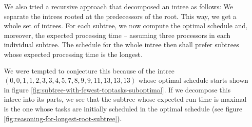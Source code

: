 We also tried a recursive approach that decomposed an intree as follows: We separate the intrees rooted at the predecessors of the root. This way, we get a whole set of intrees. For each subtree, we now compute the optimal schedule and, moreover, the expected processing time -- assuming three processors in each individual subtree. The schedule for the whole intree then shall prefer subtrees whose expected processing time is the longest.

We were tempted to conjecture this because of the intree $(0,0,1,1,2,3,3,4,5,7,8,9,9,11,13,13,13)$ whose optimal schedule starts shown in figure \ref{fig:subtree-with-fewest-toptasks-suboptimal}. If we decompose this intree into its parts, we see that the subtree whose expected run time is maximal is the one whose tasks are initially scheduled in the optimal schedule (see figure \ref{fig:reasoning-for-longest-root-subtree}).

